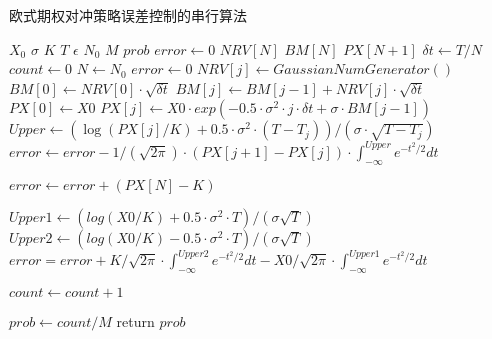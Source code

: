 \begin{algorithm}
  \caption{欧式期权对冲策略误差控制的串行算法}
  \label{alg:bserror}
	\begin{algorithmic}[1]
	 \Require $X_0$ 
	 \Require $\sigma$ 
	 \Require $K$ 
	 \Require $T$ 
	 \Require $\epsilon$ 
         \Require $N_{0}$ 
         \Require $M$ 
         \Ensure $prob$
         \State $error \gets 0$ 
         \State $NRV[N]$ 
         \State $BM[N]$ 
         \State $PX[N+1]$ 
	 \State $\delta t \gets T/N$ 
	 \State $count \gets 0$ 
         \State $N \gets N_0$
	   
          \State $error \gets 0$ 
	     $NRV[j] \gets GaussianNumGenerator()$
	  \EndFor
	  \State $BM[0] \gets NRV[0] \cdot \sqrt{\delta t}$ 
	     $BM[j] \gets BM[j-1] + NRV[j]\cdot \sqrt{\delta t}$ 
	  \EndFor
	  \State $PX[0] \gets X0$
	  \State $PX[j]\gets X0 \cdot exp(-0.5\cdot \sigma^2 \cdot j \cdot \delta t + \sigma \cdot BM[j-1])$
	  \EndFor
	  \State $Upper \gets (\log(PX[j]/K) + 0.5\cdot \sigma^2 \cdot (T- T_j))/ (\sigma \cdot \sqrt{T-T_j})$ 
	  \State $error \gets error - 1/(\sqrt{2\pi}) \cdot (PX[j+1]-PX[j])\cdot \int_{-\infty}^{Upper}e^{-t^2/2}dt $
	  \EndFor

	  \State $error \gets error + (PX[N]-K)$
	  \EndIf

	  \State $Upper1 \gets (log(X0/K) + 0.5\cdot \sigma^2 \cdot T)/(\sigma \sqrt{T})$
	  \State $Upper2 \gets (log(X0/K) - 0.5\cdot \sigma^2 \cdot T)/(\sigma \sqrt{T})$
	  \State $error = error + K/\sqrt{2\pi} \cdot \int_{-\infty}^{Upper2}e^{-t^2/2}dt -X0/\sqrt{2\pi}\cdot \int_{-\infty}^{Upper1}e^{-t^2/2}dt$
	  
	  \State $count \gets count + 1$ 
	  \EndIf
	  \EndFor

	  \State $prob \gets count/M$
	  \State return $prob$
	 \EndProcedure
  \end{algorithmic}
\end{algorithm}






